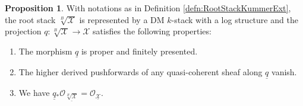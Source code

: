 \documentclass[11pt]{amsart}
\newcommand{\MScomment}[1]{\textcolor{OliveGreen}{[MS: #1]}}
\theoremstyle{definition}
\theoremstyle{definition}
\newtheorem{proposition}[theorem]{Proposition}
\newtheorem{remark}[theorem]{Remark}
\newcommand{\cX}{\mathcal{X}}
\newcommand{\cY}{\mathcal{Y}}
\newcommand{\ul}[1]{\underline{#1}}
\newcommand{\cal}{\mathcal}
\def\cX{{\cal X}}
\def\cY{{\cal Y}}
\begin{document}
\begin{proposition}\label{proposition: root stacks are a thing}
    With notations as in Definition \ref{defn:RootStackKummerExt}, the root stack $\!\!\sqrt[B]{\mathcal{X}}$ is represented by a DM $k$-stack with a log structure and the projection $q\colon \!\!\sqrt[B]{\mathcal{X}}\rightarrow \mathcal{X}$ satisfies the following properties:
    \begin{enumerate}
        \item\label{item: rooto first blood} The morphism $\ul{q}$ is proper and finitely presented.
        \item\label{item: root stack pushforward exact} The higher derived pushforwards of any quasi-coherent sheaf along $\ul{q}$ vanish.%
        \item\label{item: root stack push forward structure sheaf} We have $\underline{q}{}_*\mathcal{O}_{\underline{\!\!\sqrt[B]{\mathcal{X}}}} = \mathcal{O}_{\underline{\mathcal{X}}}$.
    \end{enumerate}
\end{proposition}
\end{document}
